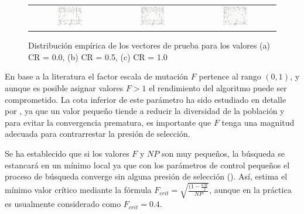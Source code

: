 \begin{figure}%
\centering
\begin{tabular}{ccc}
   \includegraphics[width=0.33\textwidth]{Figures_Chapter6/Empirical_CR_0.eps} &
   \includegraphics[width=0.33\textwidth]{Figures_Chapter6/Empirical_CR_05.eps} &
   \includegraphics[width=0.33\textwidth]{Figures_Chapter6/Empirical_CR_1.eps} 
\end{tabular}
\caption{Distribución empírica de los vectores de prueba para los valores (a) CR = 0.0, (b) CR = 0.5, (c) CR = 1.0}
\label{fig:Seleccion_Empirica}
\end{figure}

En base a la literatura el factor escala de mutación $F$ pertence al rango $(0,1)$, y aunque es posible asignar valores $F>1$ el rendimiento del algoritmo puede ser comprometido.
%
La cota inferior de este parámetro ha sido estudiado en detalle por \cite{zaharie2002critical}, ya que un valor pequeño tiende a reducir la diversidad de la población y para evitar la convergencia prematura, es importante que $F$ tenga una magnitud adecuada para contrarrestar la presión de selección.
%

Se ha establecido que si los valores $F$ y $NP$ son muy pequeños, la búsqueda se estancará en un mínimo local ya que con los parámetros de control pequeños el proceso de búsqueda converge sin alguna presión de selección (\cite{kukkonen2009performance}).
%
Así, \citeauthor{zaharie2002critical} estima el mínimo valor crítico mediante la fórmula $F_{crit} = \sqrt{ \frac{(1-\frac{CR}{2}}{NP}}$, aunque en la práctica es usualmente considerado como $F_{crit}=0.4$.
%

